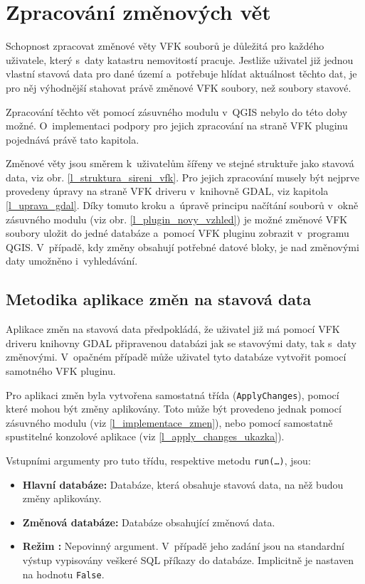 \documentclass[a4paper,12pt,oneside]{book}
\begin{document}
\section{Zpracování změnových vět}
\label{l_zpracovani_zmen}
Schopnost zpracovat změnové věty VFK souborů je důležitá pro
každého uživatele, který s~daty katastru nemovitostí pracuje. Jestliže
uživatel již jednou vlastní stavová data pro dané území a~potřebuje
hlídat aktuálnost těchto dat, je pro něj výhodnější stahovat právě
změnové VFK soubory, než soubory stavové.

Zpracování těchto vět pomocí zásuvného modulu v~QGIS nebylo do této
doby možné. O~implementaci podpory pro jejich zpracování na straně VFK
pluginu pojednává právě tato kapitola.

Změnové věty jsou směrem k~uživatelům šířeny ve stejné struktuře jako
stavová data, viz obr. \ref{l_struktura_sireni_vfk}. Pro jejich
zpracování musely být nejprve provedeny úpravy na straně VFK driveru
v~knihovně GDAL, viz kapitola \ref{l_uprava_gdal}. Díky tomuto kroku
a~úpravě principu načítání souborů v~okně zásuvného modulu (viz
obr. \ref{l_plugin_novy_vzhled}) je možné změnové VFK soubory uložit
do jedné databáze a~pomocí VFK pluginu zobrazit v~programu
QGIS. V~případě, kdy změny obsahují potřebné datové bloky, je nad
změnovými daty umožněno i~vyhledávání.

\subsection{Metodika aplikace změn na stavová data}

Aplikace změn na stavová data předpokládá, že uživatel již má pomocí
VFK driveru knihovny GDAL připravenou databázi jak se stavovými daty,
tak s~daty změnovými. V~opačném případě může uživatel tyto databáze
vytvořit pomocí samotného VFK pluginu.

Pro aplikaci změn byla vytvořena samostatná třída
(\texttt{ApplyChanges}), pomocí které mohou být změny aplikovány. Toto
může být provedeno jednak pomocí zásuvného modulu (viz
\ref{l_implementace_zmen}), nebo pomocí samostatně spustitelné
konzolové aplikace (viz \ref{l_apply_changes_ukazka}).

Vstupními argumenty pro tuto třídu, respektive metodu
\texttt{run(\dots)}, jsou:

\begin{itemize}
 \item \textbf{Hlavní databáze:} Databáze, která obsahuje stavová data, na něž budou změny aplikovány.
 \item \textbf{Změnová databáze:} Databáze obsahující změnová data.
 \item \textbf{Režim :} Nepovinný argument. V~případě jeho
   zadání jsou na standardní výstup vypisovány veškeré SQL příkazy do
   databáze. Implicitně je nastaven na hodnotu \texttt{False}.
\end{itemize}
\end{document}
